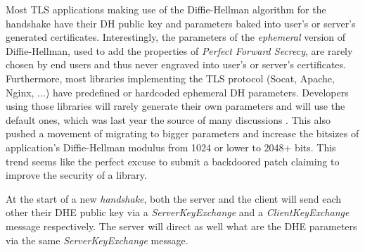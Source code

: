 \documentclass[a4paper,11pt,twocolumn]{article}
\begin{document}
Most TLS applications making use of the Diffie-Hellman algorithm for the handshake have their DH public key and parameters baked into user's or server's generated certificates. Interestingly, the parameters of the \emph{ephemeral} version of Diffie-Hellman, used to add the properties of \emph{Perfect Forward Secrecy}, are rarely chosen by end users and thus never engraved into user's or server's certificates. Furthermore, most libraries implementing the TLS protocol (Socat, Apache, Nginx, ...) have predefined or hardcoded ephemeral DH parameters. Developers using those libraries will rarely generate their own parameters and will use the default ones, which was last year the source of many discussions . This also pushed a movement of migrating to bigger parameters and increase the bitsizes of application's Diffie-Hellman modulus from 1024 or lower to 2048+ bits. This trend seems like the perfect excuse to submit a backdoored patch claiming to improve the security of a library.

At the start of a new \emph{handshake}, both the server and the client will send each other their DHE public key via a \emph{ServerKeyExchange} and a \emph{ClientKeyExchange} message respectively. The server will direct as well what are the DHE parameters via the same \emph{ServerKeyExchange} message.

\begin{center}
\end{center}
\end{document}
